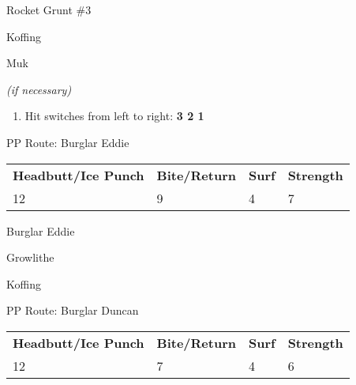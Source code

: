 \begin{paracol}{2}
\switchcolumn
\begin{trainer}{Rocket Grunt \#3}
	\varwb
	\begin{fightSection}{Koffing}
		\item {} \bite
	\end{fightSection}
	\begin{fightSection}{Muk}
		\item {} \surf
		\begin{notes}
			\small{\item {} \bite{} \textit{(if necessary)}}
		\end{notes}
	\end{fightSection}
	\varwe
\end{trainer}

\begin{enumerate}[resume]
	\item Hit switches from left to right: \textbf{3 \pointRight{} 2 \pointRight{} 1}
\end{enumerate}

\switchcolumn
\newpage
\begin{misc}{PP Route: Burglar Eddie}
	\varwb
	\begin{tabu} to \textwidth {X[6,c] X[5,c] X[4,c] X[4,c]}
		\textbf{Headbutt/Ice Punch} & \textbf{Bite/Return} & \textbf{Surf} & \textbf{Strength}\\ 
		12 & 9 & 4 & 7
	\end{tabu}
	\varwe
\end{misc}

\switchcolumn
\newpage
\begin{trainer}{Burglar Eddie}
	\varwb
	\begin{fightSection}{Growlithe}
		\item {} \strength
	\end{fightSection}
	\begin{fightSection}{Koffing}
		\item {} \bite
	\end{fightSection}
	\varwe
\end{trainer}

\switchcolumn*
\begin{misc}{PP Route: Burglar Duncan}
	\varwb
	\begin{tabu} to \textwidth {X[6,c] X[5,c] X[4,c] X[4,c]}
		\textbf{Headbutt/Ice Punch} & \textbf{Bite/Return} & \textbf{Surf} & \textbf{Strength}\\ 
		12 & 7 & 4 & 6
	\end{tabu}
	\varwe
\end{misc}


\end{paracol}
